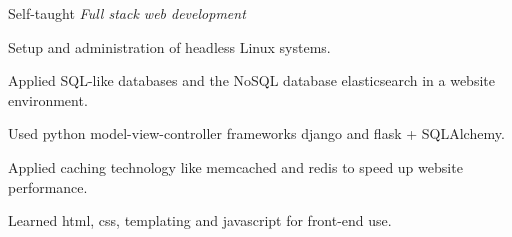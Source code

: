 \begin{cventries}
\cventry
  {Self-taught} %
  {\textit{Full stack web development}} %
  {} %
  {} %
  {
    \begin{cvitems} %
      \item {Setup and administration of headless Linux systems.}
      \item {Applied SQL-like databases and the NoSQL database elasticsearch in a website environment.}
      \item {Used python model-view-controller frameworks django and flask + SQLAlchemy.}
      \item {Applied caching technology like memcached and redis to speed up website performance.}
      \item {Learned html, css, templating and javascript for front-end use.}
    \end{cvitems}
  }
\end{cventries}
